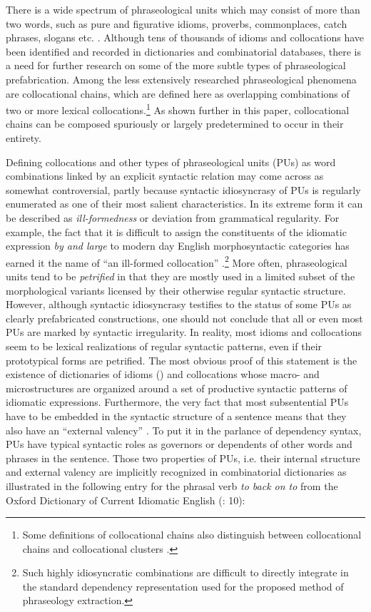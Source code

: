 \documentclass[output=paper]{langscibook}
\begin{document}
There is a wide spectrum of phraseological units which may consist of more than two words, such as pure and figurative idioms, proverbs, commonplaces, catch phrases, slogans etc. \citep{Cowie1998}. Although tens of thousands of idioms and collocations have been identified and recorded in dictionaries and combinatorial databases, there is a need for further research on some of the more subtle types of phraseological prefabrication. Among the less extensively researched phraseological phenomena are collocational chains, which are defined here as overlapping combinations of two or more lexical collocations.\footnote{Some definitions of collocational chains also distinguish between collocational chains and collocational clusters \citep{Hausmann2004,HeidGouws2006}.} As shown further in this paper, collocational chains can be composed spuriously or largely predetermined to occur in their entirety.

Defining collocations and other types of phraseological units (PUs) as word combinations linked by an explicit syntactic relation may come across as somewhat controversial, partly because syntactic idiosyncrasy of PUs is regularly enumerated as one of their most salient characteristics. In its extreme form it can be described as \textit{ill-formedness} or deviation from grammatical regularity. For example, the fact that it is difficult to assign the constituents of the idiomatic expression \textit{by and large} to modern day English morphosyntactic categories has earned it the name of ``an ill-formed collocation'' \citep{Moon1998}.\footnote{Such highly idiosyncratic combinations are difficult to directly integrate in the standard dependency representation used for the proposed method of phraseology extraction.}  More often, phraseological units tend to be \textit{petrified} in that they are mostly used in a limited subset of the morphological variants licensed by their otherwise regular syntactic structure. However, although syntactic idiosyncrasy testifies to the status of some PUs as clearly prefabricated constructions, one should not conclude that all or even most PUs are marked by syntactic irregularity. In reality, most idioms and collocations seem to be lexical realizations of regular syntactic patterns, even if their prototypical forms are petrified. The most obvious proof of this statement is the existence of dictionaries of idioms (\citealt{CowieMackin1975,CowieEtAl1993}) and collocations \citep{CrowtherEtAl2003} whose macro- and microstructures are organized around a set of productive syntactic patterns of idiomatic expressions. Furthermore, the very fact that most subsentential PUs have to be embedded in the syntactic structure of a sentence means that they also have an ``external valency'' \citep{Burger2003}. To put it in the parlance of dependency syntax, PUs have typical syntactic roles as governors or dependents of other words and phrases in the sentence. Those two properties of PUs, i.e. their internal structure and external valency are implicitly recognized in combinatorial dictionaries as illustrated in the following entry for the phrasal verb \textit{to back on to} from the Oxford Dictionary of Current Idiomatic English (\citealt{CowieMackin1975}: 10):
\end{document}
